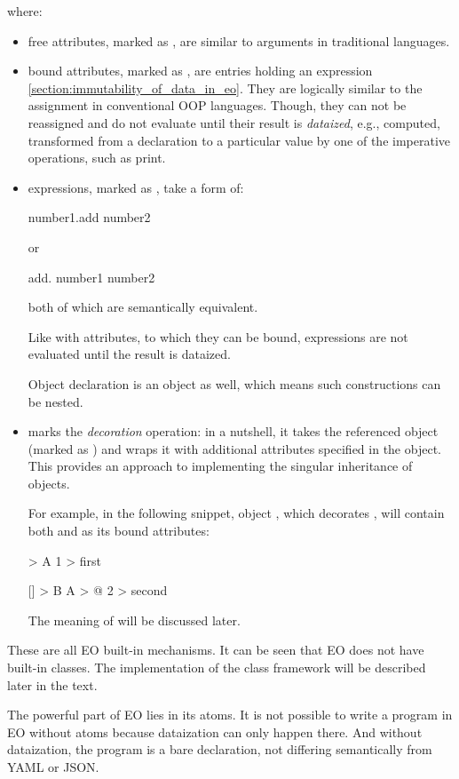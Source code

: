 where:
\begin{itemize}
    \item free attributes, marked as , are similar to arguments in traditional languages.
    \item bound attributes, marked as , are entries holding an expression \ref{section:immutability_of_data_in_eo}. They are logically similar to the assignment in conventional OOP languages. Though, they can not be reassigned and do not evaluate until their result is \textit{dataized}, e.g., computed, transformed from a declaration to a particular value by one of the imperative operations, such as print.
    \item expressions, marked as , take a form of:
\begin{ffcode}
number1.add
    number2
\end{ffcode}
          or 
\begin{ffcode}
add.
    number1
    number2
\end{ffcode}
    both of which are semantically equivalent.

    Like with attributes, to which they can be bound, expressions are not evaluated until the result is dataized.

    Object declaration is an object as well, which means such constructions can be nested.
    \item {} marks the \textit{decoration} operation: in a nutshell, it takes the referenced object (marked as ) and wraps it with additional attributes specified in the object. This provides an approach to implementing the singular inheritance of objects.
    
    For example, in the following snippet, object , which decorates , will contain both  and  as its bound attributes:

    \begin{ffcode}
[] > A
  1 > first

[] > B
  A > @
  2 > second
    \end{ffcode}

    The meaning of  will be discussed later.
\end{itemize}

These are all EO built-in mechanisms. It can be seen that EO does not have built-in classes. The implementation of the class framework will be described later in the text.

The powerful part of EO lies in its atoms. It is not possible to write a program in EO without atoms because dataization can only happen there. And without dataization, the program is a bare declaration, not differing semantically from YAML or JSON.

